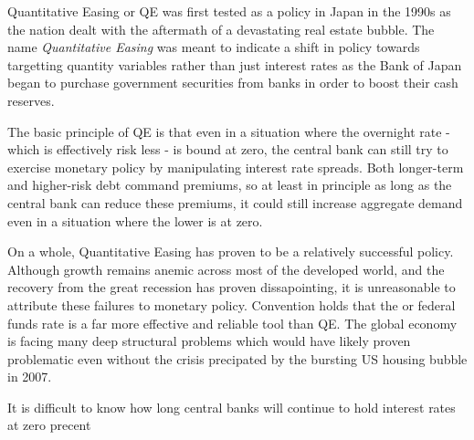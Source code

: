 \documentclass[12pt]{report}
\begin{document}
Quantitative Easing or QE was first tested as a policy in Japan in the 1990s as the nation dealt with the aftermath of a devastating real estate bubble.\autocite[274]{joyce2012quantitative}
The name \emph{Quantitative Easing} was meant to indicate a shift in policy towards targetting quantity variables rather than just interest rates as the Bank of Japan began to purchase government securities from banks in order to boost their cash reserves.\autocite[274]{joyce2012quantitative}

The basic principle of QE is that even in a situation where the overnight rate - which is effectively risk less - is bound at zero, the central bank can still try to exercise monetary policy by manipulating interest rate spreads.\autocite[466]{blinder2010quantitative}
Both longer-term and higher-risk debt command premiums, so at least in principle as long as the central bank can reduce these premiums, it could still increase aggregate demand even in a situation where the lower is at zero.\autocite[466]{blinder2010quantitative}

On a whole, Quantitative Easing has proven to be a relatively successful policy.
Although growth remains anemic across most of the developed world, and the recovery from the great recession has proven dissapointing, it is unreasonable to attribute these failures to monetary policy.
Convention holds that the or federal funds rate is a far more effective and reliable tool than QE.\autocite[465]{blinder2010quantitative}
The global economy is facing many deep structural problems which would have likely proven problematic even without the crisis precipated by the bursting US housing bubble in 2007.

It is difficult to know how long central banks will continue to hold interest rates at zero precent

\begin{appendices}


\end{appendices}

\nocite{*}
\printbibliography
\end{document}
